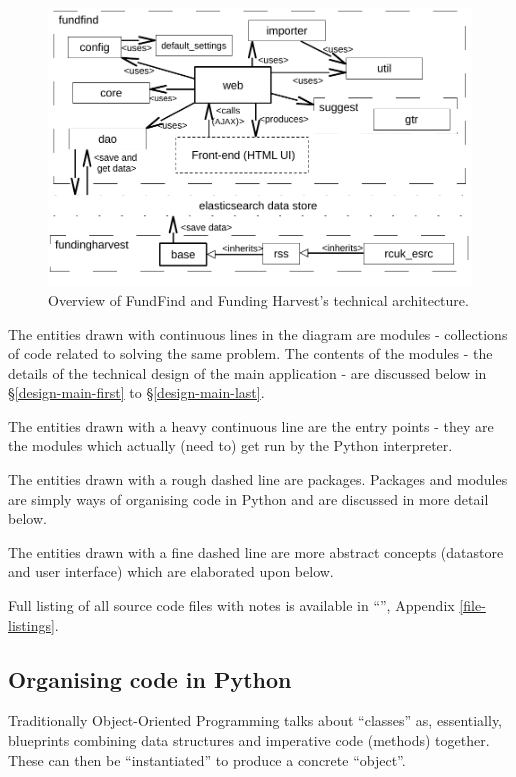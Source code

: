 \begin{figure}[H]
\centering
\includegraphics[width=1.00\textwidth,]{Chapter3/overview_design.pdf}
\caption{Overview of FundFind and Funding Harvest's technical architecture.}
\label{fig:arch}
\end{figure}

The entities drawn with continuous lines in the diagram are modules - collections of code related to solving the same problem. The contents of the modules - the details of the technical design of the main application - are discussed below in \S\ref{design-main-first} to \S\ref{design-main-last}.

The entities drawn with a heavy continuous line are the entry points - they are the modules which actually (need to) get run by the Python interpreter.

The entities drawn with a rough dashed line are packages. Packages and modules are simply ways of organising code in Python and are discussed in more detail below.

The entities drawn with a fine dashed line are more abstract concepts (datastore and user interface) which are elaborated upon below.

Full listing of all source code files with notes is available in ``'', Appendix \ref{file-listings}.

\subsection{Organising code in Python}
Traditionally Object-Oriented Programming talks about ``classes'' as, essentially, blueprints combining data structures and imperative code (methods) together. These can then be ``instantiated'' to produce a concrete ``object''.


